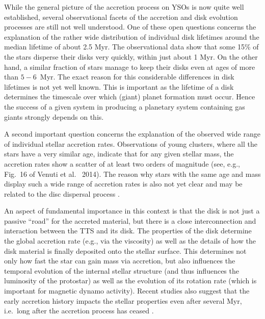 \documentclass[10pt,fleqn,twoside]{article}
\begin{document}
\medskip

While the general picture of the accretion process on YSOs is now quite well established,
several observational facets of the accretion and disk evolution processes
are still not well understood.
%
One of these open questions concerns the explanation of  the rather wide distribution 
of individual disk lifetimes
around the median lifetime of about 2.5 Myr.
The observational data show that some 15\% of the stars disperse their disks very quickly, within
just about 1 Myr.  On the other hand, a similar fraction of stars manage to keep their
disks even at ages of more than $5-6$~Myr. 
The exact reason for this considerable differences 
in disk lifetimes is not yet well known. This is important as the
lifetime of a disk determines the timescale over which (giant) planet
formation must occur. Hence the success of a given system in producing
a planetary system containing gas giants strongly depends on this. 

A second important question concerns the explanation of the observed
wide range of individual stellar accretion rates.
Observations of young clusters, where all the stars have a very similar age,
indicate that for any given stellar mass, the accretion rates show a scatter
of at least two orders of magnitude (see, e.g., Fig.~16 of Venuti et al.~ 2014).
 The reason why stars with the same age and mass display such a wide
range of accretion rates is also not yet clear and may be related to
the disc dispersal process \citep{Owen11,Ercolano14}.



\bigskip


An aspect of fundamental importance in this context is that the disk is not
just a passive ``road'' for the accreted material,
but there is a close interconnection and interaction between
the TTS and its disk.
%
The properties of the disk determine the global accretion rate 
(e.g., via the viscosity) as well 
as the details of how the disk material is
finally deposited onto the stellar surface. This determines
 not only 
how fast the star can gain
mass via accretion, but also influences the temporal evolution of the 
internal stellar structure (and thus influences the luminosity of the protostar)
as well as the evolution of its rotation rate (which is important for 
magnetic dynamo activity). Recent studies also suggest that the
early accretion history impacts the stellar properties even after
several Myr, i.e.~long after the accretion process has ceased \citep[see][]{Baraffe16}.
\end{document}
